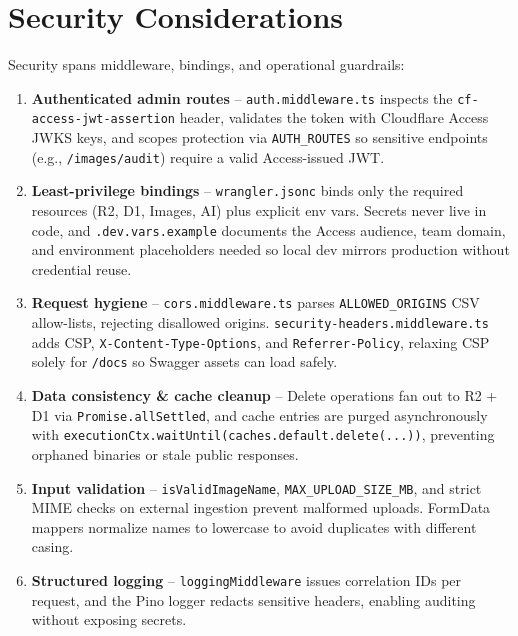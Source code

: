 \documentclass[12pt]{article}
\begin{document}
\section{Security Considerations}
Security spans middleware, bindings, and operational guardrails:
\begin{enumerate}[leftmargin=*]
  \item \textbf{Authenticated admin routes} – \texttt{auth.middleware.ts} inspects the \texttt{cf-access-jwt-assertion} header, validates the token with Cloudflare Access JWKS keys, and scopes protection via \texttt{AUTH\_ROUTES} so sensitive endpoints (e.g., \texttt{/images/audit}) require a valid Access-issued JWT.
  \item \textbf{Least-privilege bindings} – \texttt{wrangler.jsonc} binds only the required resources (R2, D1, Images, AI) plus explicit env vars. Secrets never live in code, and \texttt{.dev.vars.example} documents the Access audience, team domain, and environment placeholders needed so local dev mirrors production without credential reuse.
  \item \textbf{Request hygiene} – \texttt{cors.middleware.ts} parses \texttt{ALLOWED\_ORIGINS} CSV allow-lists, rejecting disallowed origins. \texttt{security-headers.middleware.ts} adds CSP, \texttt{X-Content-Type-Options}, and \texttt{Referrer-Policy}, relaxing CSP solely for \texttt{/docs} so Swagger assets can load safely.
  \item \textbf{Data consistency \& cache cleanup} – Delete operations fan out to R2 + D1 via \texttt{Promise.allSettled}, and cache entries are purged asynchronously with \texttt{executionCtx.waitUntil(caches.default.delete(...))}, preventing orphaned binaries or stale public responses.
  \item \textbf{Input validation} – \texttt{isValidImageName}, \texttt{MAX\_UPLOAD\_SIZE\_MB}, and strict MIME checks on external ingestion prevent malformed uploads. FormData mappers normalize names to lowercase to avoid duplicates with different casing.
  \item \textbf{Structured logging} – \texttt{loggingMiddleware} issues correlation IDs per request, and the Pino logger redacts sensitive headers, enabling auditing without exposing secrets.
\end{enumerate}
\end{document}

